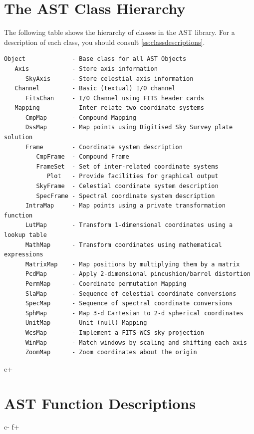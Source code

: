 \documentclass[twoside,11pt]{article}
\newcommand{\appref}[1]{Appendix~\ref{#1}}
\renewcommand{\appref}[1]{\ref{#1}}
\begin{document}

\cleardoublepage
\section{\label{ss:classhierarchy}The AST Class Hierarchy}
The following table shows the hierarchy of classes in the AST library.
For a description of each class, you should consult
\appref{ss:classdescriptions}.

\small
\begin{verbatim}
Object             - Base class for all AST Objects
   Axis            - Store axis information
      SkyAxis      - Store celestial axis information
   Channel         - Basic (textual) I/O channel
      FitsChan     - I/O Channel using FITS header cards
   Mapping         - Inter-relate two coordinate systems
      CmpMap       - Compound Mapping
      DssMap       - Map points using Digitised Sky Survey plate solution
      Frame        - Coordinate system description
         CmpFrame  - Compound Frame
         FrameSet  - Set of inter-related coordinate systems
            Plot   - Provide facilities for graphical output
         SkyFrame  - Celestial coordinate system description
         SpecFrame - Spectral coordinate system description
      IntraMap     - Map points using a private transformation function
      LutMap       - Transform 1-dimensional coordinates using a lookup table
      MathMap      - Transform coordinates using mathematical expressions
      MatrixMap    - Map positions by multiplying them by a matrix
      PcdMap       - Apply 2-dimensional pincushion/barrel distortion
      PermMap      - Coordinate permutation Mapping
      SlaMap       - Sequence of celestial coordinate conversions
      SpecMap      - Sequence of spectral coordinate conversions
      SphMap       - Map 3-d Cartesian to 2-d spherical coordinates
      UnitMap      - Unit (null) Mapping
      WcsMap       - Implement a FITS-WCS sky projection
      WinMap       - Match windows by scaling and shifting each axis
      ZoomMap      - Zoom coordinates about the origin
\end{verbatim}
\normalsize

\cleardoublepage
c+
\section{\label{ss:functiondescriptions}AST Function Descriptions}
\small

\normalsize
c-
f+
\end{document}
